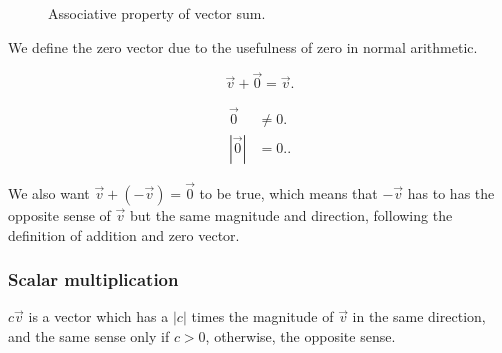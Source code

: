 \begin{figure}[htpb]
    \begin{center}
    \end{center}
    \caption{Associative property of vector sum.}%
    \label{fig:vector-sum-associative}
\end{figure}

We define the zero vector due to the usefulness of zero in normal arithmetic.

\begin{definition}
    \[
        \vec{v}+\vec{0}=\vec{v}
    .\]
\end{definition}

\begin{note}
    \begin{align*}
         \vec{0}  & \neq 0. \\
        |\vec{0}| &   =  0.
    .\end{align*}
\end{note}

We also want $\vec{v}+(-\vec{v})=\vec{0}$ to be true, which means that $-\vec{v}$ has to has the opposite sense of $\vec{v}$ but the same magnitude and direction, following the definition of addition and zero vector.

\subsubsection{Scalar multiplication}%
\label{ssub:vector-scalar-multiplication}

\begin{definition}
    $c \vec{v}$ is a vector which has a $|c|$ times the magnitude of $\vec{v}$ in the same direction, and the same sense only if $c>0$, otherwise, the opposite sense.
\end{definition}


